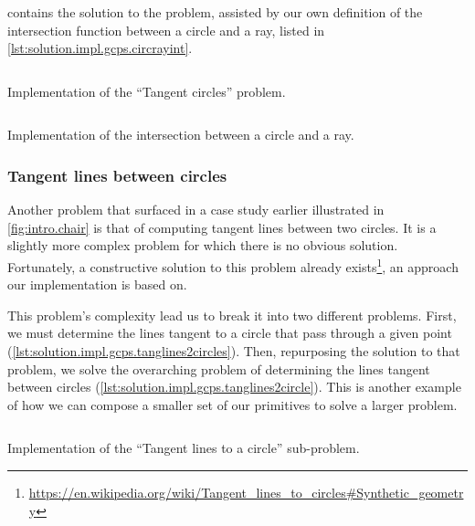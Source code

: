  contains the solution to the
problem, assisted by our own definition of the intersection function between a
circle and a ray, listed in \cref{lst:solution.impl.gcps.circrayint}.

\begin{listing}[htb]
  \inputminted[firstline=11]{julia}{jl/tangent_circles.jl}
  \caption[Tangent circles]{
    Implementation of the ``Tangent circles'' problem.}%
  \label{lst:solution.impl.gcps.tangentcircles}
\end{listing}

\begin{listing}
  \inputminted[lastline=9]{julia}{jl/tangent_circles.jl}
  \caption[Circle-Ray intersection]{
    Implementation of the intersection between a circle and a ray.}%
  \label{lst:solution.impl.gcps.circrayint}
\end{listing}

\subsubsection{Tangent lines between circles}%
\label{sec:solution.impl.gcps.tanglines2circles}

Another problem that surfaced in a case study earlier illustrated in
\cref{fig:intro.chair} is that of computing tangent lines between two circles.
It is a slightly more complex problem for which there is no obvious solution.
Fortunately, a constructive solution to this problem already
exists\footnote{\url{https://en.wikipedia.org/wiki/Tangent_lines_to_circles\#Synthetic_geometry}},
an approach our implementation is based on.

This problem's complexity lead us to break it into two different problems.
First, we must determine the lines tangent to a circle that pass through a given
point (\cref{lst:solution.impl.gcps.tanglines2circles}).  Then, repurposing the
solution to that problem, we solve the overarching problem of determining the
lines tangent between circles (\cref{lst:solution.impl.gcps.tanglines2circle}).
This is another example of how we can compose a smaller set of our primitives to
solve a larger problem.

\begin{listing}[htbp]
  \inputminted[firstline=2,lastline=16]{julia}{jl/circ_tangent_lines.jl}
  \caption[Tangent lines to a circle]{
    Implementation of the ``Tangent lines to a circle'' sub-problem.}%
  \label{lst:solution.impl.gcps.tanglines2circles}
\end{listing}

